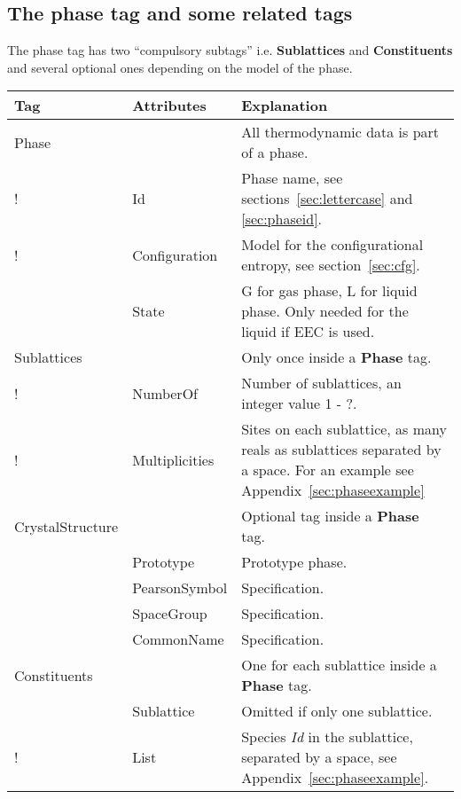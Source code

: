 \documentclass{article}
\begin{document}

\subsection{The phase tag and some related tags}\label{sec:phase}\label{sec:dispart}

The phase tag has two ``compulsory subtags'' i.e. {\bf Sublattices}
and {\bf Constituents} and several optional ones depending on the
model of the phase.

\begin{tabular}{|p{} p{} p{}|}\hline
  Tag & Attributes & Explanation\\\hline

  Phase & & All thermodynamic data is part of a phase.\\
!       & Id & Phase name, see sections~\ref{sec:lettercase} and 
               \ref{sec:phaseid}. \\

!       & Configuration &  Model for the configurational entropy, see section~\ref{sec:cfg}.\\

         & State & G for gas phase, L for liquid phase.  
                 Only needed for the liquid if EEC is used.\\\hline
  Sublattices & & Only once inside a {\bf Phase} tag.\\
!        & NumberOf &  Number of sublattices, an integer value 1 - ?. \\
!        & Multiplicities & Sites on each sublattice, as many reals as
           sublattices separated by a space.  For an example 
           see Appendix~\ref{sec:phaseexample}\\\hline

  CrystalStructure & & Optional tag inside a {\bf Phase} tag.\\
        & Prototype & Prototype phase.\\
        & PearsonSymbol & Specification.\\
        & SpaceGroup & Specification.\\
        & CommonName & Specification.\\\hline

  Constituents & & One for each sublattice inside a {\bf Phase} tag.\\
               & Sublattice & Omitted if only one sublattice.\\
!              & List &  Species {\em Id} in the sublattice,
               separated by a space, see Appendix~\ref{sec:phaseexample}.\\\hline


\end{tabular}
\end{document}

